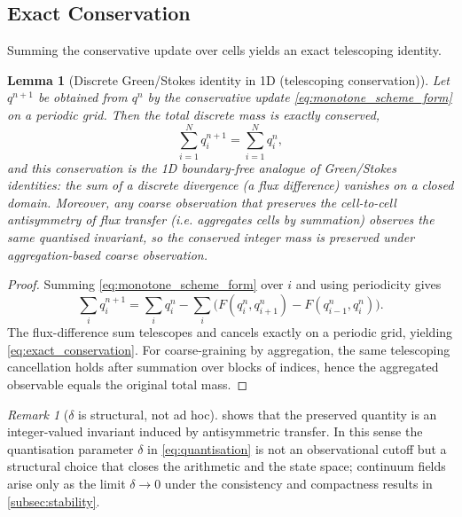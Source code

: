 \documentclass[sn-basic]{sn-jnl}
\theoremstyle{plain}
\newtheorem{lemma}[theorem]{Lemma}
\theoremstyle{remark}
\newtheorem{remark}[theorem]{Remark}
\begin{document}
\subsection{Exact Conservation}
\label{subsec:exact_conservation}

Summing the conservative update over cells yields an exact telescoping identity.

\begin{lemma}[Discrete Green/Stokes identity in 1D (telescoping conservation)]
\label{lem:discrete_stokes_1d}
Let $q^{n+1}$ be obtained from $q^n$ by the conservative update \cref{eq:monotone_scheme_form} on a periodic grid.
Then the total discrete mass is exactly conserved,
\begin{equation}
\sum_{i=1}^N q_i^{n+1}=\sum_{i=1}^N q_i^n,
\label{eq:exact_conservation}
\end{equation}
and this conservation is the 1D boundary-free analogue of Green/Stokes identities: the sum of a discrete divergence (a flux difference) vanishes on a closed domain.
Moreover, any coarse observation that preserves the cell-to-cell antisymmetry of flux transfer (i.e. aggregates cells by summation) observes the same quantised invariant, so the conserved integer mass is preserved under aggregation-based coarse observation.
\end{lemma}

\begin{proof}
Summing \cref{eq:monotone_scheme_form} over $i$ and using periodicity gives
\[
\sum_i q_i^{n+1}=\sum_i q_i^n-\sum_i\big(F(q_i^n,q_{i+1}^n)-F(q_{i-1}^n,q_i^n)\big).
\]
The flux-difference sum telescopes and cancels exactly on a periodic grid, yielding \cref{eq:exact_conservation}.
For coarse-graining by aggregation, the same telescoping cancellation holds after summation over blocks of indices, hence the aggregated observable equals the original total mass.
\end{proof}



\begin{remark}[\texorpdfstring{$\delta$}{delta} is structural, not ad hoc]
\label{rem:delta_structural}
 shows that the preserved quantity is an integer-valued invariant induced by antisymmetric transfer.
In this sense the quantisation parameter $\delta$ in \cref{eq:quantisation} is not an observational cutoff but a structural choice that closes the arithmetic and the state space; continuum fields arise only as the limit $\delta\to 0$ under the consistency and compactness results in \cref{subsec:stability}.
\end{remark}
\end{document}
